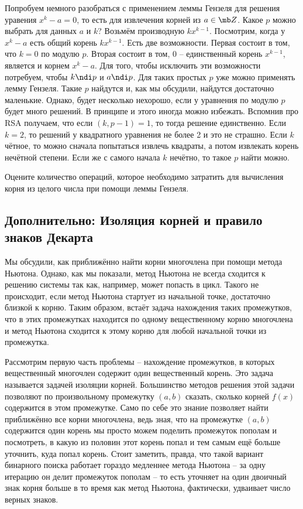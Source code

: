 Попробуем немного разобраться с применением леммы Гензеля для  решения уравения $x^k-a=0$, то есть для извлечения корней из $a \in \mb Z$. Какое  $p$ можно выбрать для данных $a$ и $k$?  
Возьмём производную $kx^{k-1}$. Посмотрим, когда у $x^k-a$ есть общий корень $kx^{k-1}$. Есть две возможности. Первая состоит в том, что $k=0$ по модулю $p$. Вторая состоит в том, $0$ -- единственный корень $x^{k-1}$, является и корнем $x^k-a$.  Для того, чтобы исключить эти возможности потребуем, чтобы $k\ndi p$ и $a\ndi p$. Для таких простых $p$ уже можно применять лемму Гензеля. Такие $p$ найдутся и, как мы обсудили, найдутся достаточно маленькие.  Однако, будет несколько нехорошо, если у уравнения по модулю $p$ будет много решений. В принципе и этого иногда можно избежать. Вспомнив про RSA  получаем, что если $(k,p-1)=1$, то тогда решение единственно. Если $k=2$, то решений у квадратного уравнения не более 2 и это не страшно. Если $k$ чётное, то можно сначала попытаться извлечь квадраты, а потом извлекать корень нечётной степени. Если же с самого начала $k$ нечётно, то такое $p$ найти можно.

\upr Оцените количество операций, которое необходимо затратить для вычисления корня из целого числа при помощи леммы Гензеля.
\eupr



\subsection{Дополнительно: Изоляция корней и правило знаков Декарта}

Мы обсудили, как приближённо найти корни многочлена при помощи метода Ньютона. Однако, как мы показали, метод Ньютона не всегда сходится к решению системы так как, например, может попасть в цикл. Такого не происходит, если метод Ньютона стартует из начальной точке, достаточно близкой к корню. Таким образом, встаёт задача нахождения таких промежутков, что в этих промежутках находится по одному вещественному корню многочлена и метод Ньютона сходится к этому корню для любой начальной точки из промежутка.

Рассмотрим первую часть проблемы -- нахождение промежутков, в которых вещественный многочлен содержит один вещественный корень. Это задача называется задачей изоляции корней. Большинство методов решения этой задачи позволяют по произвольному промежутку $(a,b)$ сказать, сколько корней $f(x)$ содержится в этом промежутке. Само по себе это знание позволяет найти приближённо все корни многочлена, ведь зная, что на промежутке $(a,b)$ содержится один корень мы просто можем поделить промежуток пополам и посмотреть, в какую из половин этот корень попал и тем самым ещё больше уточнить, куда попал корень. Стоит заметить, правда, что такой вариант бинарного поиска работает гораздо медленнее метода Ньютона -- за одну итерацию он делит промежуток пополам -- то есть уточняет на один двоичный знак корня больше в то время как метод Ньютона, фактически, удваивает число верных знаков.

